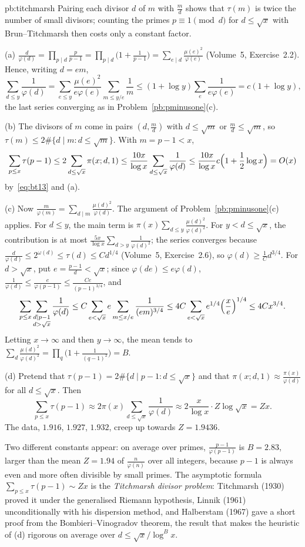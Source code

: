 \begin{solution}{pb:titchmarsh}
\idea Pairing each divisor $d$ of $m$ with $\frac md$ shows that $\tau(m)$ is twice the number of small divisors; counting the primes $p\equiv1\pmod d$ for $d\le\sqrt x$ with Brun--Titchmarsh
then costs only a constant factor.

\writeup (a) $\frac d{\varphi(d)}=\prod_{p\mid d}\frac p{p-1}=\prod_{p\mid d}\bigl(1+\frac1{p-1}\bigr)=\sum_{e\mid d}\frac{\mu(e)^2}{\varphi(e)}$ (Volume~5, Exercise~2.2). Hence, writing $d=em$,
\[
\sum_{d\le y}\frac1{\varphi(d)}=\sum_{e\le y}\frac{\mu(e)^2}{e\varphi(e)}\sum_{m\le y/e}\frac1m\le(1+\log y)\sum_e\frac1{e\varphi(e)}=c(1+\log y),
\]
the last series converging as in Problem~\ref{pb:pminusone}(c).

(b) The divisors of $m$ come in pairs $(d,\frac md)$ with $d\le\sqrt m$ or $\frac md\le\sqrt m$, so $\tau(m)\le2\#\{d\mid m:d\le\sqrt m\}$. With $m=p-1<x$,
\[
\sum_{p\le x}\tau(p-1)\le2\sum_{d\le\sqrt x}\pi(x;d,1)\le\frac{10x}{\log x}\sum_{d\le\sqrt x}\frac1{\varphi(d)}\le\frac{10x}{\log x}c\Bigl(1+\frac12\log x\Bigr)=O(x)
\]
by~\eqref{eq:bt13} and (a).

(c) Now $\frac m{\varphi(m)}=\sum_{d\mid m}\frac{\mu(d)^2}{\varphi(d)}$. The argument of Problem~\ref{pb:pminusone}(c) applies. For $d\le y$, the main term is $\pi(x)\sum_{d\le y}\frac{\mu(d)^2}{\varphi(d)^2}$.
For $y<d\le\sqrt x$, the contribution is at most $\frac{5x}{\log x}\sum_{d>y}\frac1{\varphi(d)^2}$; the series converges because $\frac d{\varphi(d)}\le2^{\omega(d)}\le\tau(d)\le C d^{1/4}$
(Volume~5, Exercise~2.6), so $\varphi(d)\ge\frac1Cd^{3/4}$. For $d>\sqrt x$, put $e=\frac{p-1}d<\sqrt x$; since $\varphi(de)\le e\varphi(d)$, $\frac1{\varphi(d)}\le\frac e{\varphi(p-1)}\le\frac{Ce}{(p-1)^{3/4}}$, and
\[
\sum_{p\le x}\sum_{\substack{d\mid p-1\\d>\sqrt x}}\frac1{\varphi(d)}\le C\sum_{e<\sqrt x}e\sum_{m\le x/e}\frac1{(em)^{3/4}}\le4C\sum_{e<\sqrt x}e^{1/4}\Bigl(\frac xe\Bigr)^{1/4}\le4Cx^{3/4}.
\]
Letting $x\to\infty$ and then $y\to\infty$, the mean tends to $\sum_d\frac{\mu(d)^2}{\varphi(d)^2}=\prod_q\bigl(1+\frac1{(q-1)^2}\bigr)=B$.

(d) Pretend that $\tau(p-1)=2\#\{d\mid p-1:d\le\sqrt x\}$ and that $\pi(x;d,1)\approx\frac{\pi(x)}{\varphi(d)}$ for all $d\le\sqrt x$. Then
\[
\sum_{p\le x}\tau(p-1)\approx2\pi(x)\sum_{d\le\sqrt x}\frac1{\varphi(d)}\approx2\frac x{\log x}\cdot Z\log\sqrt x=Zx.
\]
The data, $1.916$, $1.927$, $1.932$, creep up towards $Z=1.9436$.

\leads Two different constants appear: on average over primes, $\frac{p-1}{\varphi(p-1)}$ is $B=2.83$, larger than the mean $Z=1.94$ of $\frac n{\varphi(n)}$ over all integers, because $p-1$ is
always even and more often divisible by small primes. The asymptotic formula $\sum_{p\le x}\tau(p-1)\sim Zx$ is the \emph{Titchmarsh divisor problem}: Titchmarsh (1930) proved it under the
generalised Riemann hypothesis, Linnik (1961) unconditionally with his dispersion method, and Halberstam (1967) gave a short proof from the Bombieri--Vinogradov theorem, the result that
makes the heuristic of (d) rigorous on average over $d\le\sqrt x/\log^Bx$.
\end{solution}

